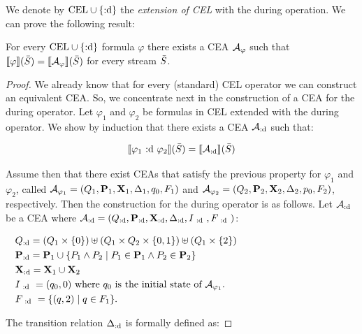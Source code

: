 We denote by $\text{CEL} \cup \{\text{:d}\}$ the \emph{extension of CEL} with the during operation. We can prove the following result:

\begin{theorem} \label{theo:CELduring}
	For every $\text{CEL} \cup \{\text{:d}\}$ formula $\varphi$ there exists a CEA $\mathcal{A}_\varphi$ such that $\sem{\varphi}(\Stream) = \sem{\cA_\varphi}(\Stream)$ for every stream $\bar{S}$.
\end{theorem}

\begin{proof}
	We already know that for every (standard) CEL operator we can construct an equivalent CEA. So, we concentrate next in the construction of a CEA for the during operator.
	Let $\varphi_1$ and $\varphi_2$ be formulas in CEL extended with the during operator. We show by induction that there exists a CEA $\mathcal{A}_{\text{:d}}$ such that:
	
	
	$$\sem{\varphi_1 \during \varphi_2}(\Stream) = \sem{\cAduring}(\Stream)$$
	
	Assume then that there exist CEAs that satisfy the previous property for $\varphi_1$ and $\varphi_2$, called $\mathcal{A}_{\varphi_1} = (Q_1, \mathbf{P}_1, \mathbf{X}_1, \Delta_1, q_0, F_1)$ and $\mathcal{A}_{\varphi_2} = (Q_2, \mathbf{P}_2, \mathbf{X}_2, \Delta_2, p_0, F_2)$, respectively. 
	Then the construction for the during operator is as follows.
	Let $\mathcal{A}_{\text{:d}}$ be a CEA where $\mathcal{A}_{\text{:d}} = (Q_{\text{:d}}, \mathbf{P}_{\text{:d}}, \mathbf{X}_{\text{:d}}, \Delta_{\text{:d}}, I_{~\text{:d}~}, F_{~\text{:d}~})$:
	
	$$\begin{aligned}[t] 		 		
		& \Qduring = (Q_1 \times \{0\}) \uplus (Q_1 \times Q_2 \times \{0, 1\}) \uplus (Q_1 \times \{2\}) \\ 		 		
		& \Pduring = \SETP_1 \cup \{ P_1 \land P_2 \mid P_1 \in \SETP_1 \land P_2 \in \SETP_2 \} \hspace*{155px}\\ 		 		
		& \Xduring  = \SETX_1 \cup \SETX_2 \\ 		 		
		& I_{\during} = (q_0, 0) \text{ where } q_0 \text{ is the initial state of }\cA_{\varphi_1}.\\ 		 		
		& F_{\during} = \{ (q, 2) \mid q \in F_1 \}. 	 	\end{aligned}$$
	
	The transition relation $\Delta_{\text{:d}}$ is formally defined as:
	

\end{proof}
